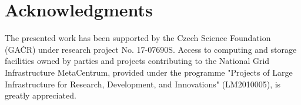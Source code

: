 \documentclass[usletter, 10pt, conference]{svjour3}      %
\begin{document}
\section{Acknowledgments}

The presented work has been supported by the Czech Science Foundation (GA{\v C}R) under research project No. 17-07690S.
Access to computing and storage facilities owned by parties and projects contributing to the National Grid Infrastructure MetaCentrum, provided under the programme "Projects of Large Infrastructure for Research, Development, and Innovations" (LM2010005), is greatly appreciated.




\end{document}

